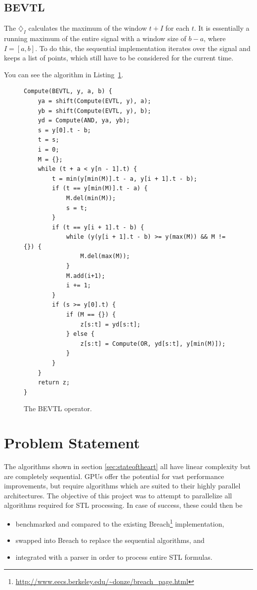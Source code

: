 \documentclass[a4paper,10pt]{article}
\newcommand{\Bevtl}{\diamondsuit_I}
\begin{document}
\subsection{BEVTL}

The $\Bevtl$ calculates the maximum of the window $t + I$ for each $t$. It is
essentially a running maximum of the entire signal with a window size of $b - a$,
where $I = [a,b]$. To do this, the sequential implementation iterates over the signal
and keeps a list of points, which still have to be considered for the current time.

You can see the algorithm in Listing~\ref{fig:bevtl}.

\begin{figure}[H]
\begin{lstlisting}
Compute(BEVTL, y, a, b) {
    ya = shift(Compute(EVTL, y), a);
    yb = shift(Compute(EVTL, y), b);
    yd = Compute(AND, ya, yb);
    s = y[0].t - b;
    t = s;
    i = 0;
    M = {};
    while (t + a < y[n - 1].t) {
        t = min(y[min(M)].t - a, y[i + 1].t - b);
        if (t == y[min(M)].t - a) {
            M.del(min(M));
            s = t;
        }
        if (t == y[i + 1].t - b) {
            while (y(y[i + 1].t - b) >= y(max(M)) && M != {}) {
                M.del(max(M));
            }
            M.add(i+1);
            i += 1;
        }
        if (s >= y[0].t) {
            if (M == {}) {
                z[s:t] = yd[s:t];
            } else {
                z[s:t] = Compute(OR, yd[s:t], y[min(M)]);
            }
        }
    }
    return z;
}
\end{lstlisting}
\label{fig:bevtl}
\caption{The BEVTL operator.}
\end{figure}

\section{Problem Statement}

The algorithms shown in section \ref{sec:stateoftheart} all have linear complexity
but are completely sequential.
GPUs offer the potential for vast performance improvements, but require algorithms
which are suited to their highly parallel architectures. The objective of this project
was to attempt to parallelize all algorithms required for STL processing. In case of success, these could then be

\begin{itemize}
\item benchmarked and compared to the existing Breach\footnote{\url{http://www.eecs.berkeley.edu/~donze/breach_page.html}} implementation,
\item swapped into Breach to replace the sequential algorithms, and
\item integrated with a parser in order to process entire STL formulas.
\end{itemize}
\end{document}
